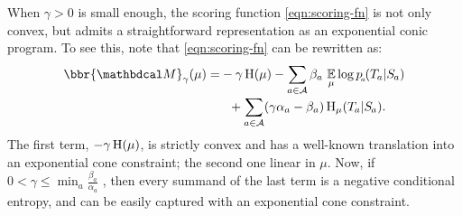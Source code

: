 \documentclass[twoside]{article}
\begin{document}
When $\gamma > 0$ is small enough,
the scoring function \eqref{eqn:scoring-fn} is not only convex,
but admits a straightforward representation as an exponential conic program.
%
To see this, note that \eqref{eqn:scoring-fn} can be rewritten \parencite[Proposition 4.6]{pdg-aaai} as:
\begin{equation}
    \begin{aligned}
        \bbr{\dg M}_\gamma(\mu) = &-\gamma\H(\mu) -
            \sum_{a \in \Ar}
                \beta_a\, \Ex_\mu
                    \log {p\ssub a(\Tgt a | \Src a)}
                \\[-0.5ex]
            &~~+ \sum_{a \in \Ar}
            (\gamma \alpha_a - \beta_a)
                \H_\mu (\Tgt a | \Src a).
    \end{aligned}
    \label{eq:altscore}
\end{equation}
The first term,
$-\gamma\operatorname{\mathrm{H}}(\mu)$,
is strictly convex and has a well-known
translation into an exponential cone constraint;
the second one linear in $\mu$.
Now,
if $0 < \gamma \le \min_{a} \frac{\beta_a}{\alpha_a}$ , then
every summand of the last term is a negative conditional entropy, and 
can be easily captured with an exponential cone constraint.
\end{document}
